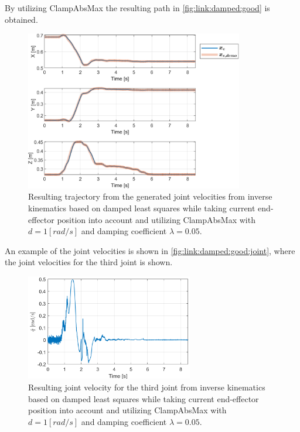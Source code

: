 \documentclass[../main.tex]{subfiles}
\begin{document}
By utilizing ClampAbsMax the resulting path in \autoref{fig:link:damped:good} is obtained.
\begin{figure}[H]
    \centering
         \includegraphics[width=0.85\textwidth]{figures/linkcollision/inversekin_damped_good.png}
     \caption{Resulting trajectory from the generated joint velocities from inverse kinematics based on damped least squares while taking current end-effector position into account and utilizing ClampAbsMax with $d = 1 [rad/s]$ and damping coefficient $\lambda = 0.05$.}
     \label{fig:link:damped:good}
\end{figure}
An example of the joint velocities is shown in \autoref{fig:link:damped:good:joint}, where the joint velocities for the third joint is shown.
\begin{figure}[H]
    \centering
         \includegraphics[width=0.65\textwidth]{figures/linkcollision/joint_3_vel_damped_good.png}
     \caption{Resulting joint velocity for the third joint from inverse kinematics based on damped least squares while taking current end-effector position into account and utilizing ClampAbsMax with $d = 1 [rad/s]$ and damping coefficient $\lambda = 0.05$.}
     \label{fig:link:damped:good:joint}
\end{figure}
\end{document}
